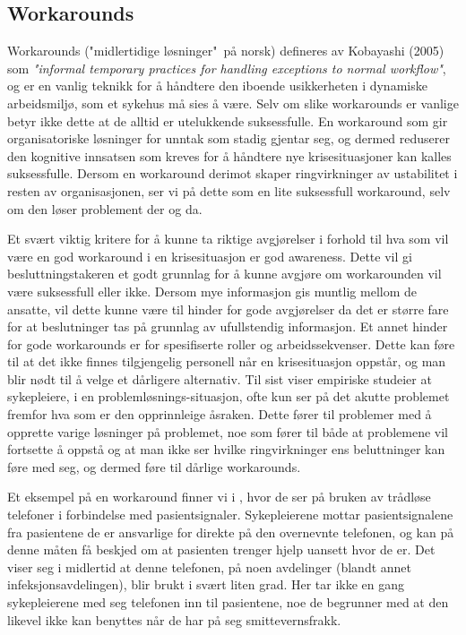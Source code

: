 \subsection{Workarounds}
\label{chp: workarounds}

Workarounds ("midlertidige løsninger"\ på norsk) defineres av Kobayashi (2005) som \emph{"informal temporary practices for handling exceptions to normal workflow"}, og er en vanlig teknikk for å håndtere den iboende usikkerheten i dynamiske arbeidsmiljø, som et sykehus må sies å være. Selv om slike workarounds er vanlige betyr ikke dette at de alltid er utelukkende suksessfulle. En workaround som gir organisatoriske løsninger for unntak som stadig gjentar seg, og dermed reduserer den kognitive innsatsen som kreves for å håndtere nye krisesituasjoner kan kalles suksessfulle. Dersom en workaround derimot skaper ringvirkninger av ustabilitet i resten av organisasjonen, ser vi på dette som en lite suksessfull workaround, selv om den løser problement der og da. \cite{Kobayashi05}

\noindent
Et svært viktig kritere for å kunne ta riktige avgjørelser i forhold til hva som vil være en god workaround i en krisesituasjon er god awareness. Dette vil gi besluttningstakeren et godt grunnlag for å kunne avgjøre om workarounden vil være suksessfull eller ikke. Dersom mye informasjon gis muntlig mellom de ansatte, vil dette kunne være til hinder for gode avgjørelser da det er større fare for at beslutninger tas på grunnlag av ufullstendig informasjon. Et annet hinder for gode workarounds er for spesifiserte roller og arbeidssekvenser. Dette kan føre til at det ikke finnes tilgjengelig personell når en krisesituasjon oppstår, og man blir nødt til å velge et dårligere alternativ. Til sist viser empiriske studeier at sykepleiere, i en problemløsnings-situasjon, ofte kun ser på det akutte problemet fremfor hva som er den opprinnleige åsraken. Dette fører til problemer med å opprette varige løsninger på problemet, noe som fører til både at problemene vil fortsette å oppstå og at man ikke ser hvilke ringvirkninger ens beluttninger kan føre med seg, og dermed føre til dårlige workarounds. \cite{Kobayashi05}

\noindent
Et eksempel på en workaround finner vi i \cite{KlemetsRedundancy}, hvor de ser på bruken av trådløse telefoner i forbindelse med pasientsignaler. Sykepleierene mottar pasientsignalene fra pasientene de er ansvarlige for direkte på den overnevnte telefonen, og kan på denne måten få beskjed om at pasienten trenger hjelp uansett hvor de er. Det viser seg i midlertid at denne telefonen, på noen avdelinger (blandt annet infeksjonsavdelingen), blir brukt i svært liten grad. Her tar ikke en gang sykepleierene med seg telefonen inn til pasientene, noe de begrunner med at den likevel ikke kan benyttes når de har på seg smittevernsfrakk. \cite{KlemetsRedundancy}

